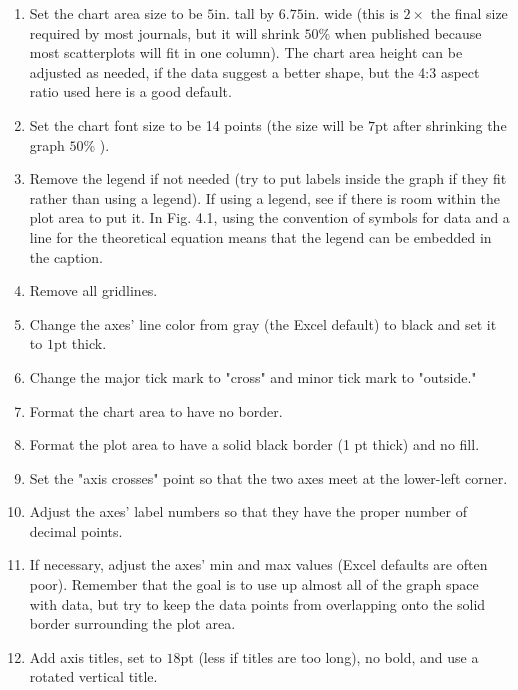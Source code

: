 \begin{enumerate}
  \item Set the chart area size to be $5 \mathrm{in}$. tall by $6.75 \mathrm{in}$. wide (this is $2 \times$ the final size required by most journals, but it will shrink $50 \%$ when published because most scatterplots will fit in one column). The chart area height can be adjusted as needed, if the data suggest a better shape, but the 4:3 aspect ratio used here is a good default.

  \item Set the chart font size to be 14 points (the size will be $7 \mathrm{pt}$ after shrinking the graph $50 \%$ ).

  \item Remove the legend if not needed (try to put labels inside the graph if they fit rather than using a legend). If using a legend, see if there is room within the plot area to put it. In Fig. 4.1, using the convention of symbols for data and a line for the theoretical equation means that the legend can be embedded in the caption.

  \item Remove all gridlines.

  \item Change the axes' line color from gray (the Excel default) to black and set it to $1 \mathrm{pt}$ thick.

  \item Change the major tick mark to "cross" and minor tick mark to "outside."

  \item Format the chart area to have no border.

  \item Format the plot area to have a solid black border (1 pt thick) and no fill.

  \item Set the "axis crosses" point so that the two axes meet at the lower-left corner.

  \item Adjust the axes' label numbers so that they have the proper number of decimal points.

  \item If necessary, adjust the axes' min and max values (Excel defaults are often poor). Remember that the goal is to use up almost all of the graph space with data, but try to keep the data points from overlapping onto the solid border surrounding the plot area.

  \item Add axis titles, set to $18 \mathrm{pt}$ (less if titles are too long), no bold, and use a rotated vertical title.


\end{enumerate}
